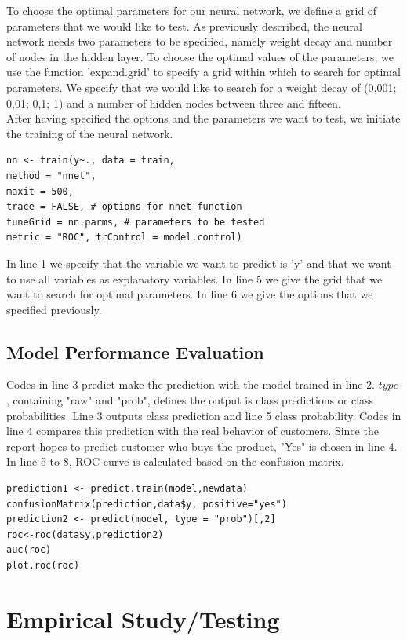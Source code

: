      To choose the optimal parameters for our neural network, we define a grid of parameters that we would like to test. As previously described, the neural network needs two parameters to be specified, namely weight decay and number of nodes in the hidden layer. To choose the optimal values of the parameters, we use the function 'expand.grid' to specify a grid within which to search for optimal parameters. We specify that we would like to search for a weight decay of (0,001; 0,01; 0,1; 1) and a number of hidden nodes between three and fifteen. \\
     [\baselineskip]\indent After having specified the options and the parameters we want to test, we initiate the training of the neural network.
     \begin{lstlisting}
nn <- train(y~., data = train,  
method = "nnet", 
maxit = 500, 
trace = FALSE, # options for nnet function
tuneGrid = nn.parms, # parameters to be tested
metric = "ROC", trControl = model.control)
     \end{lstlisting}
     In line 1 we specify that the variable we want to predict is 'y' and that we want to use all variables as explanatory variables. In line 5 we give the grid that we want to search for optimal parameters. In line 6 we give the options that we specified previously.
     \\
     \subsection{Model Performance Evaluation}
     \noindent Codes in line 3 predict make the prediction with the model trained in line 2. $type$, containing "raw" and "prob", defines the output is class predictions or class probabilities. Line 3 outputs class prediction and line 5 class probability. Codes in line 4 compares this prediction with the real behavior of customers. Since the report hopes to predict customer who buys the product, "Yes" is chosen in line 4. In line 5 to 8, ROC curve is calculated based on the confusion matrix.\\
     \begin{lstlisting}
prediction1 <- predict.train(model,newdata)
confusionMatrix(prediction,data$y, positive="yes")
prediction2 <- predict(model, type = "prob")[,2]
roc<-roc(data$y,prediction2)
auc(roc)
plot.roc(roc)
     \end{lstlisting}
     
     
    \newpage
    \pagestyle{fancy}
    \section{Empirical Study/Testing}
